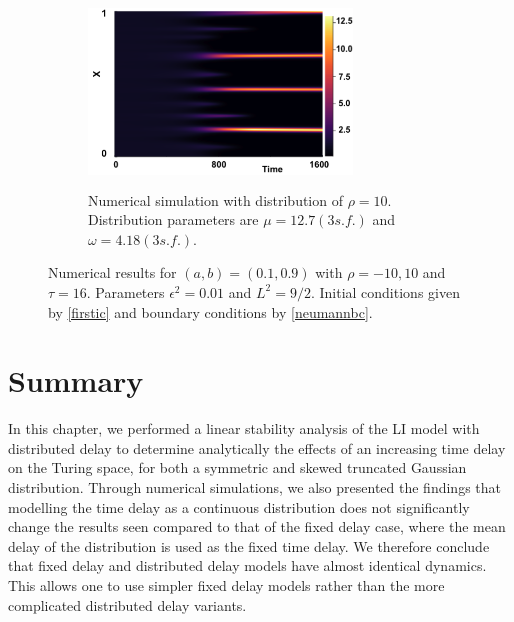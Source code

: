 \begin{figure}[H]
    \hfill
    \begin{subfigure}[t]{0.45\textwidth}
        \centering
        \includegraphics[width=7cm,height=5cm]{t1610.png}
        \caption{Numerical simulation with distribution of $\rho=10$. Distribution parameters are $\mu=12.7(3 s.f.)$ and $\omega=4.18(3 s.f.)$.}
        \label{}
    \end{subfigure}
    \caption{Numerical results for $(a,b)=(0.1,0.9)$ with $\rho=-10,10$ and $\tau=16$. Parameters $\epsilon^2=0.01$ and $L^2=9/2$. Initial conditions given by \eqref{firstic} and boundary conditions by \eqref{neumannbc}.}
    \label{fig:linskew3}
\end{figure}

\section{Summary}

In this chapter, we performed a linear stability analysis of the LI model with distributed delay to determine analytically the effects of an increasing time delay on the Turing space, for both a symmetric and skewed truncated Gaussian distribution. Through numerical simulations, we also presented the findings that modelling the time delay as a continuous distribution does not significantly change the results seen compared to that of the fixed delay case, where the mean delay of the distribution is used as the fixed time delay. We therefore conclude that fixed delay and distributed delay models have almost identical dynamics. This allows one to use simpler fixed delay models rather than the more complicated distributed delay variants.
